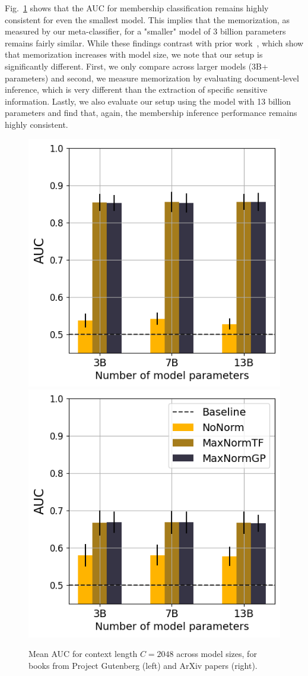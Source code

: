 \documentclass[twocolumn,10pt]{article}
\begin{document}
Fig.~\ref{fig:across_models} shows that the AUC for membership classification remains highly consistent for even the smallest model. This implies that the memorization, as measured by our meta-classifier, for a "smaller" model of 3 billion parameters remains fairly similar. While these findings contrast with prior work~\cite{carlini2022quantifying,carlini2021extracting}, which show that memorization increases with model size, we note that our setup is significantly different. First, we only compare across larger models (3B+ parameters) and second, we measure memorization by evaluating document-level inference, which is very different than the extraction of specific sensitive information. Lastly, we also evaluate our setup using the model with 13 billion parameters and find that, again, the membership inference performance remains highly consistent. 

\begin{figure}
\centering
\includegraphics[width=0.49\linewidth]{figures/across_models_books.png} 
\includegraphics[width=0.49\linewidth]
{figures/across_models_arxiv.png} 
    \caption{Mean AUC for context length $C=2048$ across model sizes, for books from Project Gutenberg (left) and ArXiv papers (right).} 
\label{fig:across_models}
\end{figure}
\end{document}
